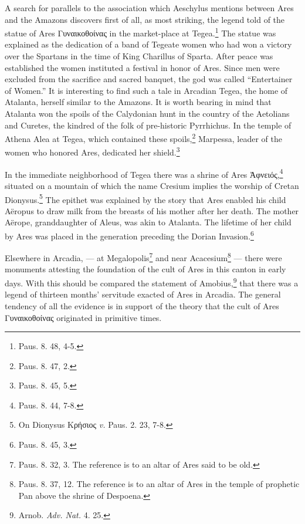 \documentclass[a4paper, 12pt, oneside]{article}
\begin{document}
A search for parallels to the association which Aeschylus mentions between Ares and the Amazons discovers first of all, as most striking, the legend told of the statue of Ares Γυναικοθοίνας in the market-place at Tegea.\footnote{Paus. 8. 48, 4-5.} The statue was explained as the dedication of a band of Tegeate women who had won a victory over the Spartans in the time of King Charillus of Sparta. After peace was established the women instituted a festival in honor of Ares. Since men were excluded from the sacrifice and sacred banquet, the god was called ``Entertainer of Women.'' It is interesting to find such a tale in Arcadian Tegea, the home of Atalanta, herself similar to the Amazons. It is worth bearing in mind that Atalanta won the spoils of the Calydonian hunt in the country of the Aetolians and Curetes, the kindred of the folk of pre-historic Pyrrhichus. In the temple of Athena Alea at Tegea, which contained these spoils,\footnote{Paus. 8. 47, 2.} Marpessa, leader of the women who honored Ares, dedicated her shield.\footnote{Paus. 8. 45, 5.}

In the immediate neighborhood of Tegea there was a shrine of Ares Ἀφνειός,\footnote{Paus. 8. 44, 7-8.} situated on a mountain of which the name Cresium implies the worship of Cretan Dionysus.\footnote{On Dionysus Κρήσιος \emph{v.} Paus. 2. 23, 7-8.} The epithet was explained by the story that Ares enabled his child Aëropus to draw milk from the breasts of his mother after her death. The mother Aërope, granddaughter of Aleus, was akin to Atalanta. The lifetime of her child by Ares was placed in the generation preceding the Dorian Invasion.\footnote{Paus. 8. 45, 3.}

Elsewhere in Arcadia, --- at Megalopolis\footnote{Paus. 8. 32, 3. The reference is to an altar of Ares said to be old.} and near Acacesium\footnote{Paus. 8. 37, 12. The reference is to an altar of Ares in the temple of prophetic Pan above the shrine of Despoena.} --- there were monuments attesting the foundation of the cult of Ares in this canton in early days. With this should be compared the statement of Amobius,\footnote{Arnob. \emph{Adv. Nat.} 4. 25.} that there was a legend of thirteen months' servitude exacted of Ares in Arcadia. The general tendency of all the evidence is in support of the theory that the cult of Ares Γυναικοθοίνας originated in primitive times.
\end{document}
